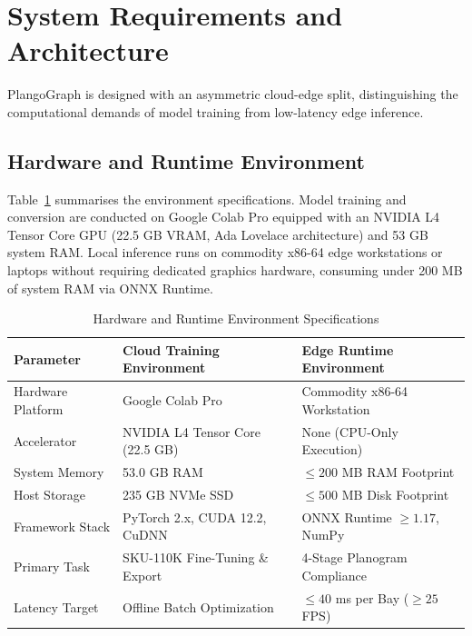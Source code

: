 \documentclass[conference]{IEEEtran}
\begin{document}
\section{System Requirements and Architecture}
PlangoGraph is designed with an asymmetric cloud-edge split, distinguishing the computational demands of model training from low-latency edge inference.

\subsection{Hardware and Runtime Environment}
Table~\ref{tab:hardware_reqs} summarises the environment specifications. Model training and conversion are conducted on Google Colab Pro equipped with an NVIDIA L4 Tensor Core GPU (22.5 GB VRAM, Ada Lovelace architecture) and 53 GB system RAM. Local inference runs on commodity x86-64 edge workstations or laptops without requiring dedicated graphics hardware, consuming under 200 MB of system RAM via ONNX Runtime.

\begin{table}[h]
\centering
\caption{Hardware and Runtime Environment Specifications}
\label{tab:hardware_reqs}
\scriptsize
\begin{tabularx}{\columnwidth}{l X X}
\toprule
\textbf{Parameter} & \textbf{Cloud Training Environment} & \textbf{Edge Runtime Environment} \\
\midrule
Hardware Platform & Google Colab Pro & Commodity x86-64 Workstation \\
Accelerator & NVIDIA L4 Tensor Core (22.5 GB) & None (CPU-Only Execution) \\
System Memory & 53.0 GB RAM & $\le 200$ MB RAM Footprint \\
Host Storage & 235 GB NVMe SSD & $\le 500$ MB Disk Footprint \\
Framework Stack & PyTorch 2.x, CUDA 12.2, CuDNN & ONNX Runtime $\ge 1.17$, NumPy \\
Primary Task & SKU-110K Fine-Tuning \& Export & 4-Stage Planogram Compliance \\
Latency Target & Offline Batch Optimization & $\le 40$ ms per Bay ($\ge 25$ FPS) \\
\bottomrule
\end{tabularx}
\end{table}
\end{document}
